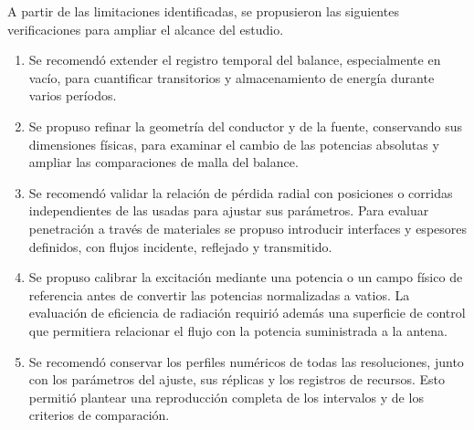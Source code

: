 A partir de las limitaciones identificadas, se propusieron las siguientes verificaciones para ampliar el alcance del estudio.
\begin{enumerate}
\item Se recomendó extender el registro temporal del balance, especialmente en vacío, para cuantificar transitorios y almacenamiento de energía durante varios períodos.
\item Se propuso refinar la geometría del conductor y de la fuente, conservando sus dimensiones físicas, para examinar el cambio de las potencias absolutas y ampliar las comparaciones de malla del balance.
\item Se recomendó validar la relación de pérdida radial con posiciones o corridas independientes de las usadas para ajustar sus parámetros. Para evaluar penetración a través de materiales se propuso introducir interfaces y espesores definidos, con flujos incidente, reflejado y transmitido.
\item Se propuso calibrar la excitación mediante una potencia o un campo físico de referencia antes de convertir las potencias normalizadas a vatios. La evaluación de eficiencia de radiación requirió además una superficie de control que permitiera relacionar el flujo con la potencia suministrada a la antena.
\item Se recomendó conservar los perfiles numéricos de todas las resoluciones, junto con los parámetros del ajuste, sus réplicas y los registros de recursos. Esto permitió plantear una reproducción completa de los intervalos y de los criterios de comparación.
\end{enumerate}
